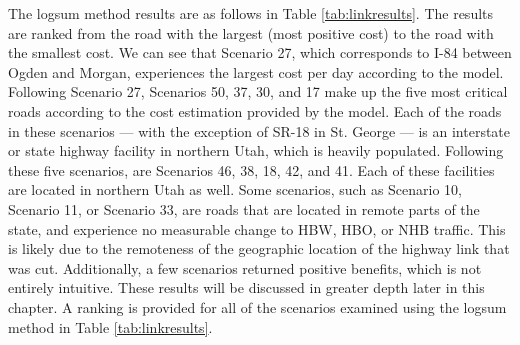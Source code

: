 The logsum method results are as follows in Table \ref{tab:linkresults}.
The results are ranked from the road with the largest (most positive
cost) to the road with the smallest cost. We can see that Scenario 27, which
corresponds to I-84 between Ogden and Morgan, experiences the largest cost
per day according to the model. Following Scenario 27, Scenarios 50, 37, 30,
and 17 make up the five most critical roads according to the cost estimation
provided by the model. Each of the roads in these scenarios --- with the exception
of SR-18 in St. George --- is an interstate or state highway facility in
northern Utah, which is heavily populated. Following these five scenarios, are
Scenarios 46, 38, 18, 42, and 41. Each of these facilities are located in northern Utah as well.
Some scenarios, such as Scenario 10,
Scenario 11, or Scenario 33, are roads that are located in remote parts of the state, and
experience no measurable change to HBW, HBO, or NHB traffic. This is
likely due to the remoteness of the geographic location of the highway
link that was cut. Additionally, a few scenarios returned positive benefits, which is not entirely intuitive. These results will be discussed in greater depth later in this chapter. A ranking is provided for all of the scenarios examined
using the logsum method in Table \ref{tab:linkresults}.

